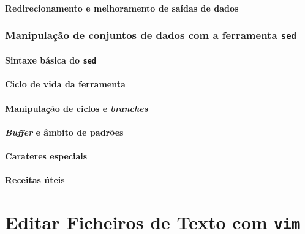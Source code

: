 \documentclass[a4paper, onecolumn, 10pt]{report}
\begin{document}
\subsubsection{Redirecionamento e melhoramento de saídas de dados}

\subsection{Manipulação de conjuntos de dados com a ferramenta \texttt{sed}}

\subsubsection{Sintaxe básica do \texttt{sed}}

\subsubsection{Ciclo de vida da ferramenta}

\subsubsection{Manipulação de ciclos e \textit{branches}}

\subsubsection{\textit{Buffer} e âmbito de padrões}

\subsubsection{Carateres especiais}

\subsubsection{Receitas úteis}

\chapter{Editar Ficheiros de Texto com \texttt{vim}}

\tableofcontents

\newpage

\printacronyms[include-classes=abbrev, name=Acrónimos]
\end{document}
